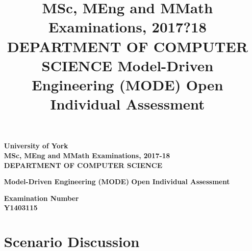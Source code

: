 \documentclass[11pt,a4paper]{scrreprt}
\title{MSc, MEng and MMath Examinations, 2017?18
	DEPARTMENT OF COMPUTER SCIENCE
	Model-Driven Engineering (MODE)
	Open Individual Assessment}
\date{}
\begin{document}
	
	\begin{titlepage}
		\begin{center}
			
			\large
			\textbf{University of York} \\
			\vspace{0.2cm}
			\textbf{MSc, MEng and MMath Examinations, 2017-18} \\
			\vspace{0.2cm}
			\textbf{DEPARTMENT OF COMPUTER SCIENCE} \\
			
			\vspace{2cm}
			
			\huge
			\textbf{Model-Driven Engineering (MODE)} 
			\textbf{Open Individual Assessment} \\
			
			\vspace{2cm}
			
			\Large
			\textbf{Examination Number} \\
			\textbf{Y1403115}
			
		\end{center}
	\end{titlepage}
	
	
\chapter{Scenario Discussion}
\end{document}

